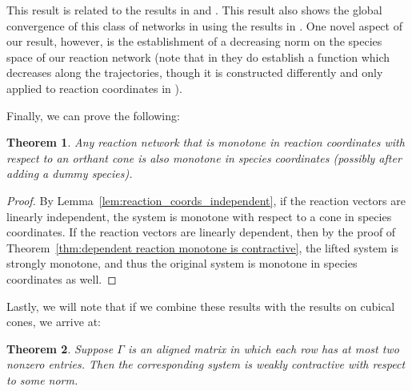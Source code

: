 \documentclass{article}
\newtheorem{thm}{Theorem}
\begin{document}
This result is related to the results in \cite{Angeli2010-hj} and \cite{ANGELI2008128}. This result also shows the global convergence of this class of networks in \cite{Angeli2010-hj} using the results in \cite{ANGELI2008128}. One novel aspect of our result, however, is the establishment of a decreasing norm on the species space of our reaction network (note that in \cite{ANGELI2008128} they do establish a function which decreases along the trajectories, though it is constructed differently and only applied to reaction coordinates in \cite{Angeli2010-hj}).


Finally, we can prove the following:

\begin{thm}
Any reaction network that is monotone in reaction coordinates with respect to an orthant cone is also monotone in species coordinates (possibly after adding a dummy species).
\end{thm}

\begin{proof}
By Lemma~\ref{lem:reaction_coords_independent}, if the reaction vectors are linearly independent, the system is monotone with respect to a cone in species coordinates. If the reaction vectors are linearly dependent, then by the proof of Theorem~\ref{thm:dependent reaction monotone is contractive}, the lifted system is strongly monotone, and thus the original system is monotone in species coordinates as well.
\end{proof}





Lastly, we will note that if we combine these results with the results on cubical cones, we arrive at:




\begin{thm}
\label{2 in each row aligned weakly contractive}
Suppose \( \Gamma \) is an aligned matrix in which each row has at most two nonzero entries. Then the corresponding system is weakly contractive with respect to some norm.
\end{thm}
\end{document}
